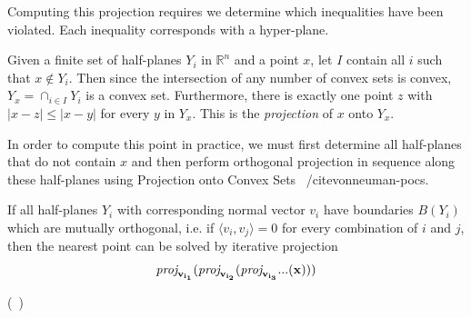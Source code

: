 Computing this projection requires we determine which inequalities
have been violated. Each inequality corresponds with a hyper-plane.
\begin{definition}
  Given a finite set of half-planes $Y_i$ in $\mathbb{R}^n$ and a point $x$,
  let $I$ contain all $i$ such that $x \notin Y_i$. Then since the
  intersection of any number of convex sets is convex, $Y_x = \cap_{i \in
    I} Y_i$ is a convex set. Furthermore, there is exactly one point
  $z$ with $|x - z| \leq |x - y|$ for every $y$ in $Y_x$. This is the
  \emph{projection} of $x$ onto $Y_x$.
\end{definition}

In order to compute this point in practice, we must first determine
all half-planes that do not contain $x$ and then perform orthogonal
projection in sequence along these half-planes using Projection onto
Convex Sets ~/cite{vonneuman-pocs}.

\begin{lemma}
  If all half-planes $Y_i$ with corresponding normal vector $v_i$ have
  boundaries $B(Y_i)$ which are mutually orthogonal, i.e. if $\langle
  v_i, v_j\rangle = 0$ for every combination of $i$ and $j$, then
  the nearest point can be solved by iterative projection 
  \begin{align}
    \vectorproj[v_{i_1}]{(\vectorproj[v_{i_2}]{(\vectorproj[v_{i_3}]{...(x)})})}
  \end{align}
\end{lemma}
(~\cite{vonneuman-pocs})

